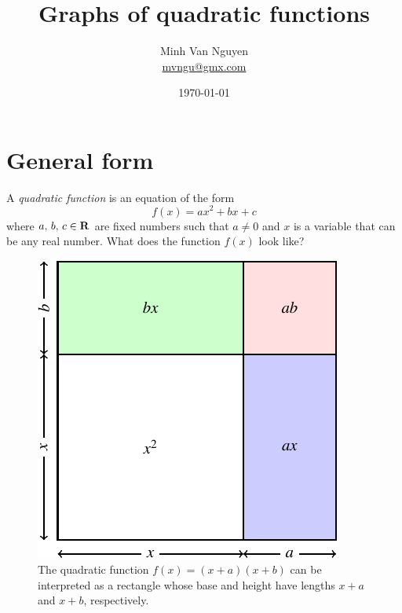 \documentclass[a4paper,oneside,12pt]{article}
\begin{document}
\title{\Large\bf Graphs of quadratic functions}
\author{%
  Minh Van Nguyen \\
  \url{mvngu@gmx.com}
}
\date{\today}
\maketitle



\section{General form}
\label{sec:general_form}

A \emph{quadratic function} is an equation of the form
\begin{equation}
\label{eqn:general_quadratic_function}
f(x)
=
ax^2 + bx + c
\end{equation}
where ${a},\, {b},\, {c} \in \mathbf{R}$ are fixed numbers such that
$a \neq 0$ and $x$ is a variable that can be any real number.  What
does the function $f(x)$ look like?

\begin{figure}[!htbp]
\centering
\includegraphics[scale=1]{image/08/quadratic-as-square.pdf}
\caption{%
  The quadratic function $f(x) = (x + a)(x + b)$ can be interpreted as
  a rectangle whose base and height have lengths $x + a$ and $x + b$,
  respectively.
}
\label{fig:quadratic_as_rectangle}
\end{figure}
\end{document}

